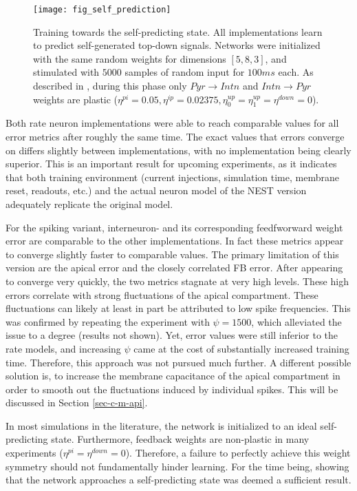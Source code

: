 \begin{figure}[h]
    \centering
    \texttt{[image: fig\_self\_prediction]}
    \caption[Training towards the self-predicting state]{Training towards the self-predicting state. All implementations
        learn to predict self-generated top-down signals. Networks were initialized with the same random weights for
        dimensions $[5, 8, 3]$, and stimulated with $5000$ samples of random input for $100ms$ each. As described in
        \citep{sacramento2018dendritic}, during this phase only $Pyr \rightarrow Intn$ and $Intn \rightarrow Pyr$
        weights are plastic ($\eta^{pi}=0.05, \eta^{ip}=0.02375, \eta^{up}_0=\eta^{up}_1=\eta^{down}=0$).}
    \label{fig-self-pred}
\end{figure}

Both rate neuron implementations were able to reach comparable values for all error metrics after roughly the same time.
The exact values that errors converge on differs slightly between implementations, with no implementation being clearly
superior. This is an important result for upcoming experiments, as it indicates that both training environment (current
injections, simulation time, membrane reset, readouts, etc.) and the actual neuron model of the NEST version adequately
replicate the original model.

For the spiking variant, interneuron- and its corresponding feedfworward weight error are comparable to the other
implementations. In fact these metrics appear to converge slightly faster to comparable values. The primary limitation
of this version are the apical error and the closely correlated FB error. After appearing to converge very quickly, the
two metrics stagnate at very high levels. These high errors correlate with strong fluctuations of the apical
compartment. These fluctuations can likely at least in part be attributed to low spike frequencies. This was confirmed
by repeating the experiment with $\psi=1500$, which alleviated the issue to a degree (results not shown). Yet, error
values were still inferior to the rate models, and increasing $\psi$ came at the cost of substantially increased
training time. Therefore, this approach was not pursued much further. A different possible solution is, to increase the
membrane capacitance of the apical compartment in order to smooth out the fluctuations induced by individual spikes.
This will be discussed in Section \ref{sec-c-m-api}.

In most simulations in the literature, the network is initialized to an ideal self-predicting state. Furthermore,
feedback weights are non-plastic in many experiments ($\eta^{pi}=\eta^{down}=0$). Therefore, a failure to perfectly
achieve this weight symmetry should not fundamentally hinder learning. For the time being, showing that the network
approaches a self-predicting state was deemed a sufficient result.


